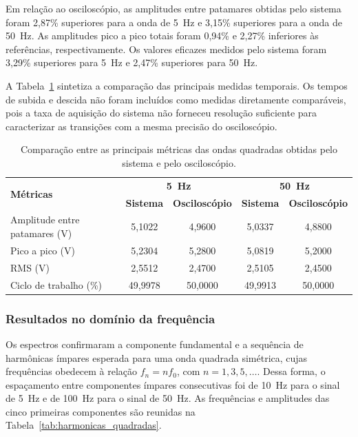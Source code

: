 \documentclass[a4paper,12pt]{fcte}
\begin{document}
Em relação ao osciloscópio, as amplitudes entre patamares obtidas pelo sistema foram 2,87\% superiores para a onda de 5~Hz e 3,15\% superiores para a onda de 50~Hz. As amplitudes pico a pico totais foram 0,94\% e 2,27\% inferiores às referências, respectivamente. Os valores eficazes medidos pelo sistema foram 3,29\% superiores para 5~Hz e 2,47\% superiores para 50~Hz.

A Tabela~\ref{tab:comparacao_osciloscopio_quadradas} sintetiza a comparação das principais medidas temporais. Os tempos de subida e descida não foram incluídos como medidas diretamente comparáveis, pois a taxa de aquisição do sistema não forneceu resolução suficiente para caracterizar as transições com a mesma precisão do osciloscópio.

\begin{table}[!htbp]
    \centering
    \caption{Comparação entre as principais métricas das ondas quadradas obtidas pelo sistema e pelo osciloscópio.}
    \label{tab:comparacao_osciloscopio_quadradas}
    \begin{tabularx}{\textwidth}{l c c c c}
        \hline
        \multirow{2}{*}{\textbf{Métricas}} &
        \multicolumn{2}{c}{\textbf{5~Hz}} &
        \multicolumn{2}{c}{\textbf{50~Hz}} \\
        &
        \textbf{Sistema} &
        \textbf{Osciloscópio} &
        \textbf{Sistema} &
        \textbf{Osciloscópio} \\
        \hline
        Amplitude entre patamares (V)
            & 5,1022 & 4,9600 & 5,0337 & 4,8800 \\
        Pico a pico (V)
            & 5,2304 & 5,2800 & 5,0819 & 5,2000 \\
        RMS (V)
            & 2,5512 & 2,4700 & 2,5105 & 2,4500 \\
        Ciclo de trabalho (\%)
            & 49,9978 & 50,0000 & 49,9913 & 50,0000 \\
        \hline
    \end{tabularx}

\end{table}

\subsubsection{Resultados no domínio da frequência}
\label{subsubsec:quadradas_frequencia}

Os espectros confirmaram a componente fundamental e a sequência de harmônicas ímpares esperada para uma onda quadrada simétrica, cujas frequências obedecem à relação $f_n=n f_0$, com $n=1,3,5,\ldots$. Dessa forma, o espaçamento entre componentes ímpares consecutivas foi de 10~Hz para o sinal de 5~Hz e de 100~Hz para o sinal de 50~Hz. As frequências e amplitudes das cinco primeiras componentes são reunidas na Tabela~\ref{tab:harmonicas_quadradas}.
\end{document}
